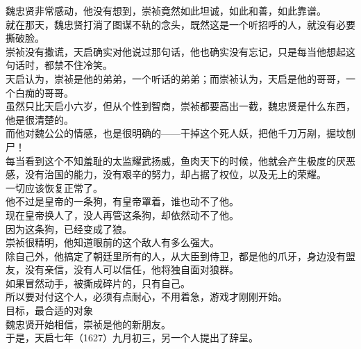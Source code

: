 \begin{multicols}{\theparacolNo}
魏忠贤非常感动，他没有想到，崇祯竟然如此坦诚，如此和善，如此靠谱。\\

就在那天，魏忠贤打消了图谋不轨的念头，既然这是一个听招呼的人，就没有必要撕破脸。\\

崇祯没有撒谎，天启确实对他说过那句话，他也确实没有忘记，只是每当他想起这句话时，都禁不住冷笑。\\

天启认为，崇祯是他的弟弟，一个听话的弟弟；而崇祯认为，天启是他的哥哥，一个白痴的哥哥。\\

虽然只比天启小六岁，但从个性到智商，崇祯都要高出一截，魏忠贤是什么东西，他是很清楚的。\\

而他对魏公公的情感，也是很明确的——干掉这个死人妖，把他千刀万剐，掘坟刨尸！\\

每当看到这个不知羞耻的太监耀武扬威，鱼肉天下的时候，他就会产生极度的厌恶感，没有治国的能力，没有艰辛的努力，却占据了权位，以及无上的荣耀。\\

一切应该恢复正常了。\\

他不过是皇帝的一条狗，有皇帝罩着，谁也动不了他。\\

现在皇帝换人了，没人再管这条狗，却依然动不了他。\\

因为这条狗，已经变成了狼。\\

崇祯很精明，他知道眼前的这个敌人有多么强大。\\

除自己外，他搞定了朝廷里所有的人，从大臣到侍卫，都是他的爪牙，身边没有盟友，没有亲信，没有人可以信任，他将独自面对狼群。\\

如果冒然动手，被撕成碎片的，只有自己。\\

所以要对付这个人，必须有点耐心，不用着急，游戏才刚刚开始。\\

目标，最合适的对象\\

魏忠贤开始相信，崇祯是他的新朋友。\\

于是，天启七年（1627）九月初三，另一个人提出了辞呈。\\


\end{multicols}
